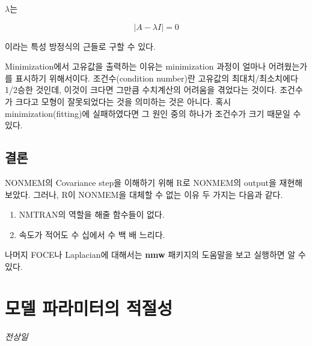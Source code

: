 \documentclass[
  10pt,
  krantz2,
  a4paper]{krantz}
\providecommand{\tightlist}{%
  \setlength{\itemsep}{0pt}\setlength{\parskip}{0pt}}
\theoremstyle{definition}
\theoremstyle{definition}
\theoremstyle{definition}
\theoremstyle{remark}
\begin{document}
\(\lambda\)는

\begin{equation}
\left| A - \lambda I \right| = 0
\label{eq:a-li-zero}
\end{equation}

이라는 특성 방정식의 근들로 구할 수 있다.

Minimization에서 고유값을 출력하는 이유는 minimization 과정이 얼마나 어려웠는가를 표시하기 위해서이다. 조건수(condition number)란 고유값의 최대치/최소치에다 1/2승한 것인데, 이것이 크다면 그만큼 수치계산의 어려움을 겪었다는 것이다. 조건수가 크다고 모형이 잘못되었다는 것을 의미하는 것은 아니다. 혹시 minimization(fitting)에 실패하였다면 그 원인 중의 하나가 조건수가 크기 때문일 수 있다.

\hypertarget{uxacb0uxb860}{%
\section{결론}\label{uxacb0uxb860}}

NONMEM의 Covariance step을 이해하기 위해 R로 NONMEM의 output을 재현해 보았다. 그러나, R이 NONMEM을 대체할 수 없는 이유 두 가지는 다음과 같다.

\begin{enumerate}
\def\labelenumi{\arabic{enumi}.}
\tightlist
\item
  NMTRAN의 역할을 해줄 함수들이 없다.
\item
  속도가 적어도 수 십에서 수 백 배 느리다.
\end{enumerate}

나머지 FOCE나 Laplacian에 대해서는 \textbf{nmw} 패키지의 도움말을 보고 실행하면 알 수 있다.

\hypertarget{parameters}{%
\chapter{모델 파라미터의 적절성}\label{parameters}}

\emph{전상일}
\end{document}
